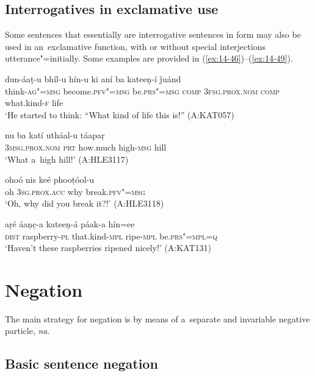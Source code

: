\subsection{Interrogatives in exclamative use}
\label{subsec:14-2-4}

Some sentences that essentially are interrogative sentences in form may also be used in an~exclamative function, with or without special interjections utterance"=initially. Some examples are provided in (\ref{ex:14-46})--(\ref{ex:14-49}). 

\begin{exe}
\ex
\label{ex:14-46}
\gll dun-áaṭ-u bhíl-u hín-u ki  aní ba kateeṇ-í ǰuánd \\
think-\textsc{ag"=msg} become.\textsc{pfv"=msg} be.\textsc{prs"=msg} \textsc{comp}  \textsc{3fsg.prox.nom} \textsc{comp} what.kind-\textsc{f} life  \\
\glt `He started to think: ``What kind of life this is!'' (A:KAT057)

\ex
\label{ex:14-47}
\gll nu ba katí utháal-u táapaṛ \\
\textsc{3msg.prox.nom} \textsc{prt} how.much high-\textsc{msg} hill  \\
\glt `What a~high hill!' (A:HLE3117)

\ex
\label{ex:14-48}
\gll ohoó nis keé phooṭóol-u \\
oh \textsc{3sg.prox.acc} why break.\textsc{pfv"=msg} \\
\glt `Oh, why did you break it?!' (A:HLE3118)

\ex
\label{ex:14-49}
\gll aṛé áaṇc̣-a kateeṇ-á páak-a hín=ee \\
\textsc{dist} raspberry-\textsc{pl} that.kind-\textsc{mpl} ripe-\textsc{mpl} be.\textsc{prs"=mpl=q} \\
\glt `Haven't these raspberries ripened nicely!' (A:KAT131)
\end{exe}

\section{Negation}
\label{sec:14-3}


The main strategy for negation is by means of a~separate and invariable negative particle, \textit{na}. 


\subsection{Basic sentence negation}
\label{subsec:14-3-1}


